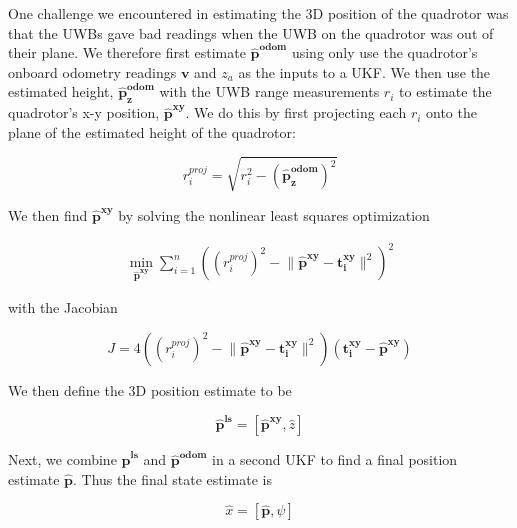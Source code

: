 One challenge we encountered in estimating the 3D position of the quadrotor was that
the UWBs gave bad readings when the UWB on the quadrotor was out of their plane.
We therefore first estimate $\bm{\hat{p}^{odom}}$ using only use the quadrotor's onboard 
odometry readings $\bm{v}$ and $z_a$ as the inputs to a UKF. We then use the estimated
height, $\bm{\hat{p}_z^{odom}}$ with the UWB range
measurements $r_i$ to estimate the quadrotor's x-y position, $\bm{\hat{p}^{xy}}$.
We do this by first projecting each $r_i$ onto the plane of the estimated height of the quadrotor:

$$
   r_i^{proj} = \sqrt{r_i^2 - (\bm{\hat{p}_z^{odom}})^2}
$$

We then find $\bm{\hat{p}^{xy}}$ by solving the nonlinear least squares optimization

\begin{align*} 
    \min_{{\bm{\hat{p}^{xy}}}} \sum_{i=1}^{n} ((r_{i}^{proj})^2 - \lVert \bm{\hat{p}^{xy}} - \bm{t_i^{xy}}\rVert^2)^2
\end{align*}

with the Jacobian

$$
    J = 4((r_i^{proj})^2 - \lVert \bm{\hat{p}^{xy}} - \bm{t_i^{xy}} \rVert^2)(\bm{t_i^{xy}} - \bm{\hat{p}^{xy}})
$$

We then define the 3D position estimate to be

$$
   \bm{\hat{p}^{ls}} = [\bm{\hat{p}^{xy}}, \hat{z}]
$$

Next, we combine $\bm{\hat{p}^{ls}}$ and $\bm{\hat{p}^{odom}}$ in a second UKF to find
a final position estimate $\bm{\hat{p}}$. Thus the final state estimate is

$$
   \hat{x} = [\bm{\hat{p}}, \psi]
$$











